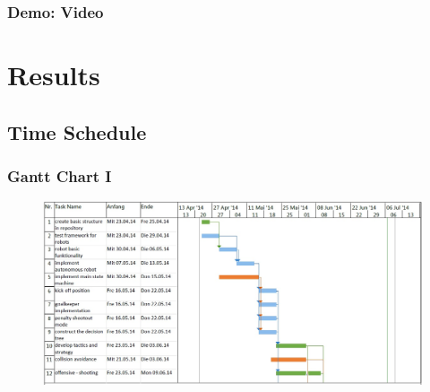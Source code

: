 \documentclass[hyperref={pdfpagelabels=false},compress]{beamer}
\begin{document}
\begin{frame}
    \frametitle{Demo: Video}
	\centering
\end{frame}

\section{Results}
\subsection{Time Schedule}
\begin{frame}
	\frametitle{Gantt Chart I}
	\begin{figure}
		\centering
		\includegraphics[width=\textwidth]{Pictures/ganttfinal1.jpg}
	\end{figure}
\end{frame}
\end{document}
